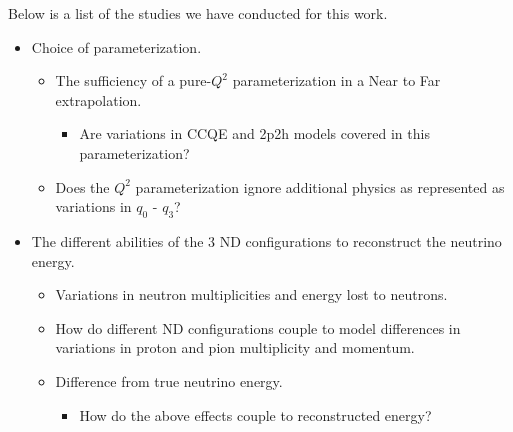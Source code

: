 \documentclass[12pt]{article}
\begin{document}
Below is a list of the studies we have conducted for this work.
\begin{itemize}
\item Choice of parameterization.
	\begin{itemize}
	\item The sufficiency of a pure-$Q^2$ parameterization in a Near to Far extrapolation.
		\begin{itemize}
			\item Are variations in CCQE and 2p2h models covered in this parameterization?
		\end{itemize} 
	\item Does the $Q^2$ parameterization ignore additional physics as represented as variations in
	 $q_0 \textrm{ - } q_3$?

	\end{itemize}
\item The different abilities of the 3 ND configurations to reconstruct the neutrino energy.
	\begin{itemize}
	\item Variations in neutron multiplicities and energy lost to neutrons.
	\item How do different ND configurations couple to model differences in variations in proton and pion multiplicity and momentum.
	\item Difference from true neutrino energy.
	\begin{itemize}
		\item How do the above effects couple to reconstructed energy?
	\end{itemize} 
	\end{itemize}


\end{itemize}
\end{document}
